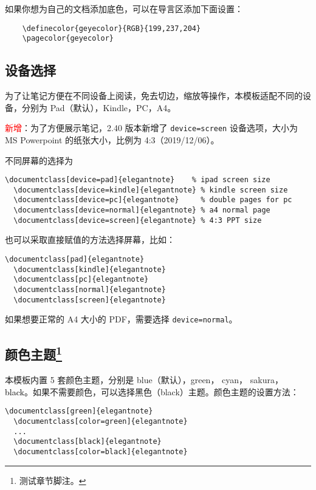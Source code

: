 \documentclass[cn,hazy,blue,screen,14pt]{elegantnote}
\begin{document}
\begin{remark}
  如果你想为自己的文档添加底色，可以在导言区添加下面设置：
  \begin{lstlisting}
    \definecolor{geyecolor}{RGB}{199,237,204}
    \pagecolor{geyecolor}
  \end{lstlisting}
\end{remark}


\subsection{设备选择}

为了让笔记方便在不同设备上阅读，免去切边，缩放等操作，本模板适配不同的设备，分别为 Pad（默认），Kindle，PC，A4。

\textcolor{red}{\kaishu 新增}：为了方便展示笔记，2.40 版本新增了 \lstinline{device=screen} 设备选项，大小为 MS Powerpoint 的纸张大小，比例为 4:3（2019/12/06）。

不同屏幕的选择为
\begin{lstlisting}[frame=none]  
  \documentclass[device=pad]{elegantnote}    % ipad screen size
  \documentclass[device=kindle]{elegantnote} % kindle screen size
  \documentclass[device=pc]{elegantnote}     % double pages for pc 
  \documentclass[device=normal]{elegantnote} % a4 normal page
  \documentclass[device=screen]{elegantnote} % 4:3 PPT size
\end{lstlisting}
\begin{note}
也可以采取直接赋值的方法选择屏幕，比如：
\end{note}
\begin{lstlisting}[frame=none]  
  \documentclass[pad]{elegantnote}
  \documentclass[kindle]{elegantnote}
  \documentclass[pc]{elegantnote}
  \documentclass[normal]{elegantnote}
  \documentclass[screen]{elegantnote}
\end{lstlisting}

\begin{note}
  如果想要正常的 A4 大小的 PDF，需要选择 \lstinline{device=normal}。
\end{note}


\subsection[颜色主题]{颜色主题\footnote{测试章节脚注。}}

本模板内置 5 套颜色主题，分别是 \textcolor{eblue}{blue}（默认），\textcolor{egreen}{green}， \textcolor{ecyan}{cyan}， \textcolor{sakura}{sakura}， \textcolor{black}{black}。如果不需要颜色，可以选择黑色（black）主题。颜色主题的设置方法：
\begin{lstlisting}[frame=none]  
  \documentclass[green]{elegantnote}
  \documentclass[color=green]{elegantnote}
  ...
  \documentclass[black]{elegantnote}
  \documentclass[color=black]{elegantnote}
\end{lstlisting}
\end{document}
